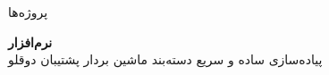 \documentclass{resume} %
\begin{document}
\begin{rSection}{پروژه‌ها}
	
	{\textbf{نرم‌افزار } } \hfill {} \\ 
	پیاده‌سازی ساده و سریع دسته‌بند ماشین بردار پشتیبان دوقلو  \\
	
%
	
\end{rSection}
\end{document}
